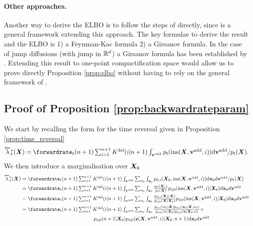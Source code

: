 \paragraph{Other approaches.} Another way to derive the ELBO is to follow
the steps of \citet{huang2021variational} directly, since
\citet{benton2022denoising} is a general framework extending this approach. The
key formulae to derive the result and the ELBO is 1) a Feynman-Kac formula 2) a
Girsanov formula.  In the case of jump diffusions (with jump in $\mathbb{R}^d$) a
Girsanov formula has been established by
\citet{cheridito2005equivalent}. Extending this result to one-point
compactification space would allow us to prove directly Proposition
\ref{prop:elbo} without having to rely on the general framework of
\citet{benton2022denoising}.

\subsection{Proof of Proposition \ref{prop:backwardrateparam}}
\label{sec:tddm-proofPropBackwardRateParam}
We start by recalling the form for the time reversal given in Proposition \ref{prop:time_reversal}
\begin{equation}
\textstyle    \backwardrate_{t}^*(\mX) = \forwardrate_{t}(n+1) \sum_{i=1}^{n+1} \delidxdist(i | n+1) \int_{\yadd} p_{t}( \textup{ins}(\mX, \yadd, i)) \rmd \yadd  / p_{t}(\mX) .
\end{equation}
We then introduce a marginalisation over ${\bm{X}}_0$
\begin{align}
    \backwardrate_{t}^*(\mX) &\textstyle = \forwardrate_{t}(n+1)  \sum_{i=1}^{n+1} \delidxdist(i | n+1) \int_{\yadd} \sum_{n_0} \int_{\rvx_0} p_{0,t}(\mX_0, \textup{ins}(\mX, \yadd, i)) \rmd \rvx_0 \rmd \yadd  /p_{t}(\mX)\\
    &\textstyle = \forwardrate_{t}(n+1) \sum_{i=1}^{n+1} \delidxdist(i | n+1) \int_{\yadd} \sum_{n_0} \int_{\rvx_0} \frac{p_0(\mX_0)}{p_t(\mX)} p_{t|0}(\textup{ins}(\mX, \yadd, i) | \mX_0) \rmd \rvx_0 \rmd \yadd\\
    &\textstyle = \forwardrate_{t}(n+1) \sum_{i=1}^{n+1} \delidxdist(i | n+1) \int_{\yadd} \sum_{n_0} \int_{\rvx_0} \frac{p_{0|t}(\mX_0 | \mX)}{p_{t|0}(\mX | \mX_0)} p_{t|0}(\textup{ins}(\mX, \yadd, i) | \mX_0) \rmd \rvx_0 \rmd \yadd\\
    &\textstyle = \forwardrate_{t}(n+1) \sum_{i=1}^{n+1} \delidxdist(i | n+1) \int_{\yadd} \sum_{n_0} \int_{\rvx_0} \frac{p_{0|t}(n_0 | \mX) p_{0|t}(\rvx_0 | \mX, n_0)}{p_{t|0}(n | \mX_0) p_{t|0}(\rvx | \mX_0, n)} \times \\
    &\textstyle  \hspace{5cm} p_{t|0}(n+1 | \mX_0) p_{t|0}( \z(\mX, \yadd, i) | \mX_0, n+1) \rmd \rvx_0 \rmd \yadd
\end{align}
